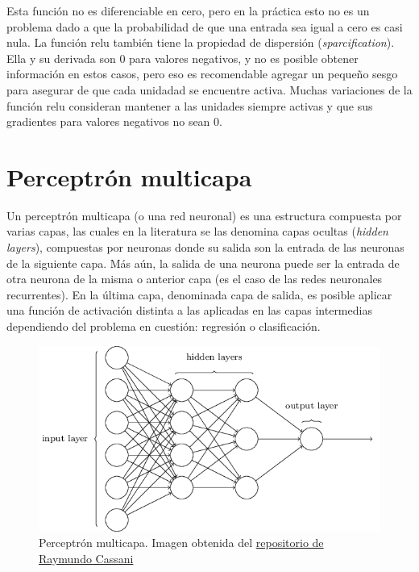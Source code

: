 \indent Esta función no es diferenciable en cero, pero en la práctica esto no es un problema dado a que la probabilidad de que una entrada sea igual a cero es casi nula. La función \acrshort{relu} también tiene la propiedad de dispersión (\textit{sparcification}). Ella y su derivada son 0 para valores negativos, y no es posible obtener información en estos casos, pero eso es recomendable agregar un pequeño sesgo para asegurar de que cada unidadad se encuentre activa. Muchas variaciones de la función \acrshort{relu} consideran mantener a las unidades siempre activas y que sus gradientes para valores negativos no sean 0.

\section{Perceptrón multicapa}

\indent Un perceptrón multicapa (o una red neuronal) es una estructura compuesta por varias capas, las cuales en la literatura se las denomina capas ocultas (\textit{hidden layers}), compuestas por neuronas donde su salida son la entrada de las neuronas de la siguiente capa. Más aún, la salida de una neurona puede ser la entrada de otra neurona de la misma o anterior capa (es el caso de las redes neuronales recurrentes). En la última capa, denominada capa de salida, es posible aplicar una función de activación distinta a las aplicadas en las capas intermedias dependiendo del problema en cuestión: regresión o clasificación. 

\begin{figure}[H]
    \centering
    \includegraphics[scale=0.6]{sections/chapter-06/images/mlp-network.png}
    \caption[Perceptrón multicapa]{Perceptrón multicapa. Imagen obtenida del \href{https://github.com/rcassani/mlp-example}{repositorio de Raymundo Cassani}}
    \label{fig:mlp_net}
\end{figure}

